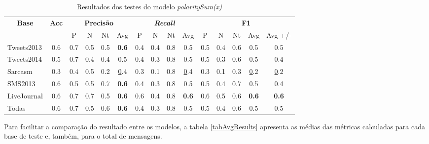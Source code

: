 \documentclass[12pt]{article}
\begin{document}
\begin{table}[H]
\centering
\begin{adjustwidth}{-1cm}{}
\begin{tabular}{lcccccccccccccc}
\multicolumn{1}{c}{\textbf{Base}} & \textbf{Acc} & \multicolumn{4}{c}{\textbf{Precisão}} & \multicolumn{4}{c}{\textit{\textbf{Recall}}} & \multicolumn{5}{c}{\textbf{F1}} \\
 &  & \multicolumn{1}{c|}{P} & \multicolumn{1}{c|}{N} & \multicolumn{1}{c|}{Nt} & Avg & \multicolumn{1}{c|}{P} & \multicolumn{1}{c|}{N} & \multicolumn{1}{c|}{Nt} & Avg & \multicolumn{1}{c|}{P} & \multicolumn{1}{c|}{N} & \multicolumn{1}{c|}{Nt} & \multicolumn{1}{c|}{Avg} & Avg +/- \\
Tweets2013 & 0.6 & 0.7 & 0.5 & 0.5 & \textbf{0.6} & 0.4 & 0.4 & 0.8 & 0.5 & 0.5 & 0.4 & 0.6 &  0.5 & 0.5 \\ \hline
Tweets2014 & 0.5 & 0.7 & 0.4 & 0.4 & 0.5 & 0.4 & 0.3 & 0.8 & 0.5 & 0.5 & 0.3 & 0.6 & 0.5 & 0.4 \\ \hline
Sarcasm & 0.3 & 0.4 & 0.5 & 0.2 & {\ul0.4} & 0.3 & 0.1 & 0.8 & {\ul0.4} & 0.3 & 0.1 & 0.3 & {\ul0.2} & {\ul0.2} \\ \hline
SMS2013 & 0.6 & 0.5 & 0.5 & 0.7 & \textbf{0.6} & 0.4 & 0.3 & 0.8 & 0.5 & 0.5 & 0.4 & 0.7 & 0.5 & 0.4 \\ \hline
LiveJournal & 0.6 & 0.7 & 0.7 & 0.5 & \textbf{0.6} & 0.6 & 0.4 & 0.8 & \textbf{0.6} & 0.6 & 0.5 & 0.6 & \textbf{0.6} & \textbf{0.6} \\ \hline
Todas & 0.6 & 0.7 & 0.5 & 0.6 & \textbf{0.6} & 0.4 & 0.3 & 0.8 & 0.5 & 0.5 & 0.4 & 0.6 & 0.5 & 0.5 \\ \hline
\end{tabular}
\caption{Resultados dos testes do modelo \emph{polaritySum(x)}}
\label{test1}
\end{adjustwidth}
\end{table}

Para facilitar a comparação do resultado entre os modelos, a tabela \ref{tabAvgResults} apresenta as médias das métricas calculadas para cada base de teste e, também, para o total de mensagens.
\end{document}
